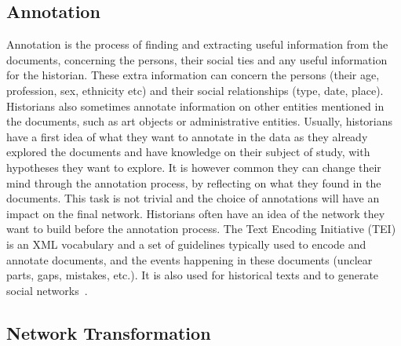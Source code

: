\documentclass{vgtc}                          %
\begin{document}
\subsection{Annotation}

Annotation is the process of finding and extracting useful information from the documents, concerning the persons, their social ties and any useful information for the historian. These extra information can concern the persons (their age, profession, sex, ethnicity etc) and their social relationships (type, date, place).
Historians also sometimes annotate information on other entities mentioned in the documents, such as art objects or administrative entities. 
Usually, historians have a first idea of what they want to annotate in the data as they already explored the documents and have knowledge on their subject of study, with hypotheses they want to explore. It is however common they can change their mind through the annotation process, by reflecting on what they found in the documents. 
This task is not trivial and the choice of annotations will have an impact on the final network. Historians often have an idea of the network they want to build before the annotation process. 
The Text Encoding Initiative (TEI)~\cite{TEI} is an XML vocabulary and a set of guidelines typically used to encode and annotate documents, and the events happening in these documents (unclear parts, gaps, mistakes, etc.). It is also used for historical texts and to generate social networks~\cite{dufournaud_comparaison_2006}.

\subsection{Network Transformation}
\end{document}

